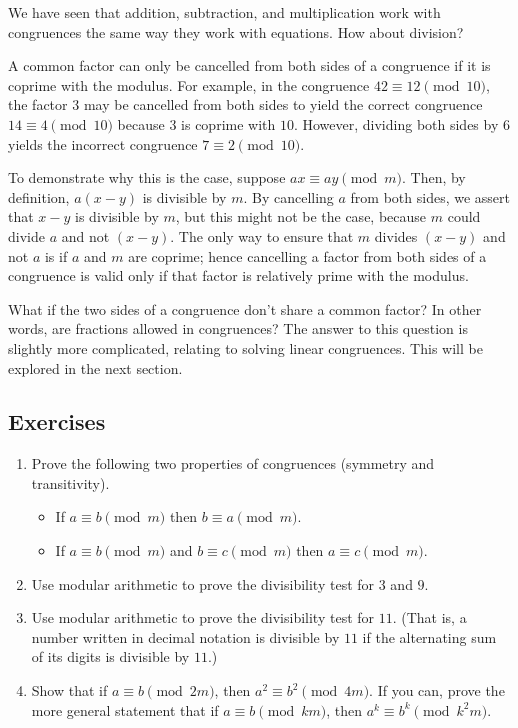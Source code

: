We have seen that addition, subtraction, and multiplication work with congruences the same way
they work with equations. How about division?

A common factor can only be cancelled from both sides of a congruence if it is coprime with the modulus.
For example, in the congruence \(42\equiv12\pmod{10}\), the factor \(3\) may be cancelled from
both sides to yield the correct congruence \(14\equiv4\pmod{10}\) because \(3\) is coprime with \(10\).
However, dividing both sides by \(6\) yields the incorrect congruence \(7\equiv2\pmod{10}\).

To demonstrate why this is the case, suppose \(ax\equiv ay\pmod{m}\). Then, by definition, \(a(x-y)\) is divisible by \(m\).
By cancelling \(a\) from both sides, we assert that \(x-y\) is divisible by \(m\), but this might
not be the case, because \(m\) could divide \(a\) and not \((x-y)\). The only way to ensure that \(m\)
divides \((x-y)\) and not \(a\) is if \(a\) and \(m\) are coprime; hence cancelling a factor from
both sides of a congruence is valid only if that factor is relatively prime with the modulus.

What if the two sides of a congruence don't share a common factor? In other words, are fractions
allowed in congruences? The answer to this question is slightly more complicated, relating
to solving linear congruences. This will be explored in the next section.
\subsection{Exercises}
\begin{enumerate}
\item Prove the following two properties of congruences (symmetry and transitivity).
  \begin{itemize}
  \item If \(a\equiv b\pmod{m}\) then \(b\equiv a\pmod{m}\).
  \item If \(a\equiv b\pmod{m}\) and \(b\equiv c\pmod{m}\) then \(a\equiv c\pmod{m}\).
  \end{itemize}
\item Use modular arithmetic to prove the divisibility test for \(3\) and \(9\).
\item Use modular arithmetic to prove the divisibility test for \(11\). (That is, a number written
  in decimal notation is divisible by \(11\) if the alternating sum of its digits is divisible by \(11\).)
\item Show that if \(a\equiv b\pmod{2m}\), then \(a^2\equiv b^2\pmod{4m}\). If you can, prove the more
  general statement that if \(a\equiv b\pmod{km}\), then \(a^k\equiv b^k\pmod{k^2m}\).
\end{enumerate}
